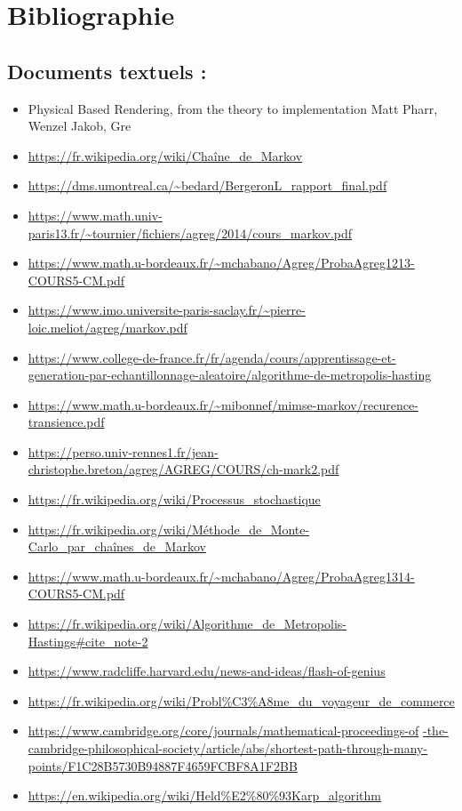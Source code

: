 \documentclass{article}
\begin{document}
\newpage
\section{Bibliographie}

\subsection{Documents textuels :}
\begin{itemize}
    \item Physical Based Rendering, from the theory to implementation Matt Pharr, Wenzel Jakob, Gre
    \item \url{https://fr.wikipedia.org/wiki/Chaîne_de_Markov}
    \item \url{https://dms.umontreal.ca/~bedard/BergeronL_rapport_final.pdf}
    \item \url{https://www.math.univ-paris13.fr/~tournier/fichiers/agreg/2014/cours_markov.pdf}
    \item \url{https://www.math.u-bordeaux.fr/~mchabano/Agreg/ProbaAgreg1213-COURS5-CM.pdf}
    \item \url{https://www.imo.universite-paris-saclay.fr/~pierre-loic.meliot/agreg/markov.pdf}
    \item \url{https://www.college-de-france.fr/fr/agenda/cours/apprentissage-et-generation-par-echantillonnage-aleatoire/algorithme-de-metropolis-hasting}
    \item \url{https://www.math.u-bordeaux.fr/~mibonnef/mimse-markov/recurence-transience.pdf}
    \item \url{https://perso.univ-rennes1.fr/jean-christophe.breton/agreg/AGREG/COURS/ch-mark2.pdf}
    \item \url{https://fr.wikipedia.org/wiki/Processus_stochastique}
    \item \url{https://fr.wikipedia.org/wiki/Méthode_de_Monte-Carlo_par_chaînes_de_Markov}
    \item \url{https://www.math.u-bordeaux.fr/~mchabano/Agreg/ProbaAgreg1314-COURS5-CM.pdf}
    \item \url{https://fr.wikipedia.org/wiki/Algorithme_de_Metropolis-Hastings#cite_note-2}
    \item \url{https://www.radcliffe.harvard.edu/news-and-ideas/flash-of-genius}
    \item \url{https://fr.wikipedia.org/wiki/Probl\%C3\%A8me_du_voyageur_de_commerce}
    \item \url{https://www.cambridge.org/core/journals/mathematical-proceedings-of} \url{-the-cambridge-philosophical-society/article/abs/shortest-path-through-many-points/F1C28B5730B94887F4659FCBF8A1F2BB} %
    \item \url{https://en.wikipedia.org/wiki/Held%E2%80%93Karp_algorithm} \\
\end{itemize}
\end{document}
